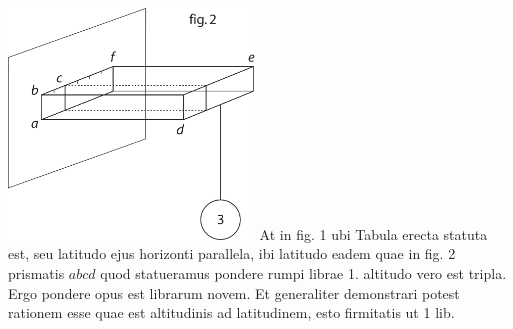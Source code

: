 \pend
\vspace*{2.5em}%
\pstart
\noindent%
\centering%
\includegraphics[width=0.49\textwidth]{images/LH037,04_051-052d-2.pdf}
\pend
\vspace*{2.5em}%
\pstart
At in fig. 1 ubi Tabula erecta statuta est, seu latitudo ejus
horizonti parallela, ibi latitudo eadem quae in fig. 2 prismatis $\displaystyle abcd$
quod statueramus pondere rumpi librae\protect{} 1. altitudo vero est tripla. Ergo
pondere opus est librarum\protect{} novem.
\pend
\newpage
\pstart%
Et generaliter demonstrari potest rationem
esse quae est altitudinis ad latitudinem, esto
firmitatis\protect{} ut 1 lib.
